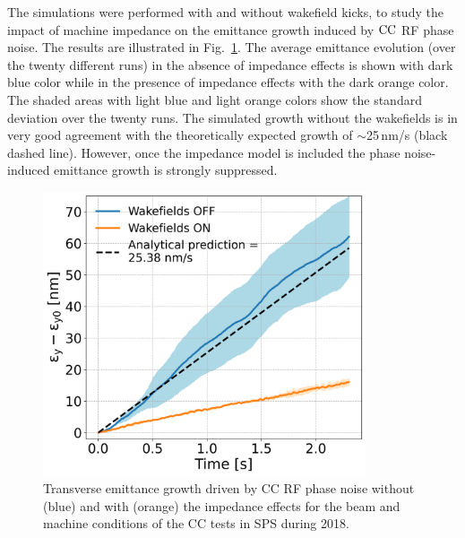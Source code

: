 The simulations were performed with and without wakefield kicks, to study the impact of machine impedance on the emittance growth induced by ${\mathrm{CC}}$ RF phase noise. The results are illustrated in Fig.~\ref{fig:MD_2018_impedance_simulations}. The average emittance evolution (over the twenty different runs) in the absence of impedance effects is shown with dark blue color while in the presence of impedance effects with the dark orange color. The shaded areas with light blue and light orange colors show the standard deviation over the twenty runs. The simulated growth without the wakefields is in very good agreement with the theoretically expected growth of $\sim$25\,nm/s (black dashed line). However, once the impedance model is included the phase noise-induced emittance growth is strongly suppressed.

\begin{figure}[!h] 
    \centering         
    \includegraphics[width=0.85\textwidth]{images/Ch7/sps_270GeV_PN1e-8_400MHz_SPS_NewWakesAllcontributions_appendWakes_y-plane_WakesOFF_QpxQpy5e-1_6D_Nb5e5_intensity3e10_wakesONvsOFF_emittance_evolution.png}
        \caption{Transverse emittance growth driven by CC RF phase noise without (blue) and with (orange) the impedance effects for the beam and machine conditions of the CC tests in SPS during 2018.}
        \label{fig:MD_2018_impedance_simulations}
 \end{figure}

